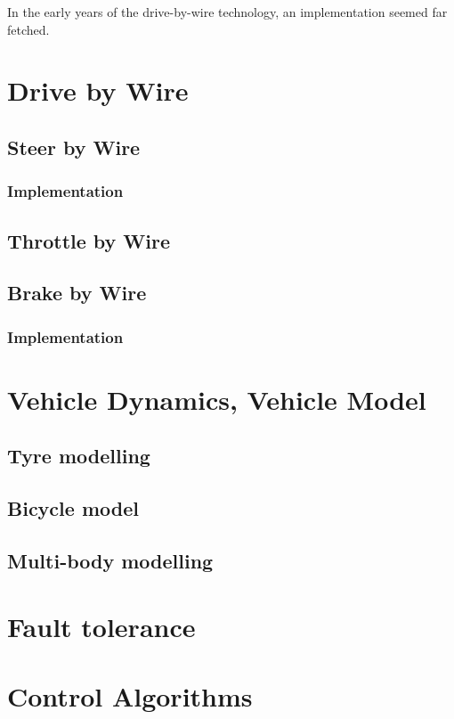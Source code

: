 \documentclass[conference]{IEEEtran}
\begin{document}
In the early years of the drive-by-wire technology, an implementation seemed far fetched.

\section{Drive by Wire}

\subsection{Steer by Wire}

\subsubsection{Implementation}

\subsection{Throttle by Wire}

\subsection{Brake by Wire}
\subsubsection{Implementation}


\section{Vehicle Dynamics, Vehicle Model}
\subsection{Tyre modelling}
\subsection{Bicycle model}
\subsection{Multi-body modelling}

\section{Fault tolerance}


\section{Control Algorithms}
\end{document}

